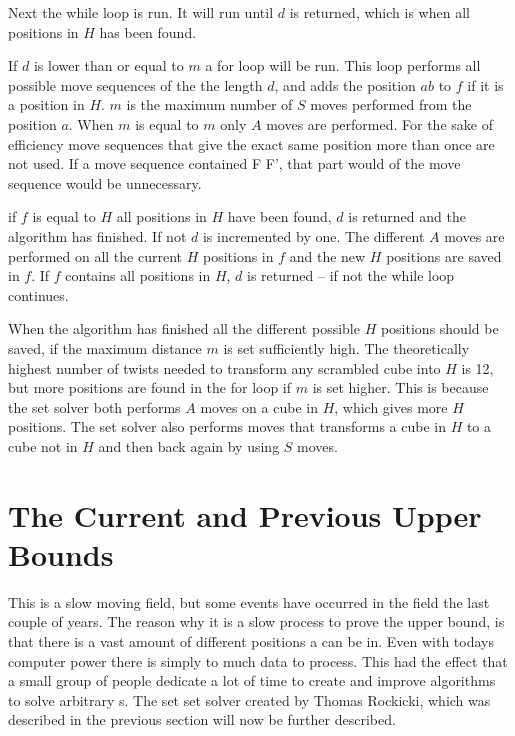 Next the while loop is run. It will run until $d$ is returned, which is when all positions in $H$ has been found.

If $d$ is lower than or equal to $m$ a for loop will be run. This loop performs all possible move sequences of the the length $d$, and adds the position $ab$ to $f$ if it is a position in $H$. $m$ is the maximum number of $S$ moves performed from the position $a$. When $m$ is equal to $m$ only $A$ moves are performed. %
For the sake of efficiency move sequences that give the exact same position more than once are not used. If a move sequence contained F F', that part would  of the move sequence would be unnecessary. 

if $f$ is equal to $H$ all positions in $H$ have been found, $d$ is returned and the algorithm has finished. 
If not $d$ is incremented by one. 
The different $A$ moves are performed on all the current $H$ positions in $f$ and the new $H$ positions are saved in $f$.
If $f$ contains all positions in $H$, $d$ is returned -- if not the while loop continues.


When the algorithm has finished all the different possible $H$ positions should be saved, if the maximum distance $m$ is set sufficiently high. The theoretically highest number of twists needed to transform any scrambled cube into $H$ is 12, but more positions are found in the for loop if $m$ is set higher. This is because the set solver both performs $A$ moves on a cube in $H$, which gives more $H$ positions. The set solver also performs moves that transforms a cube in $H$ to a cube not in $H$ and then back again by using $S$ moves.



\section{The Current and Previous Upper Bounds}
This is a slow moving field, but some events have occurred in the field the last couple of years.%
The reason why it is a slow process to prove the upper bound, is that there is a vast amount of different positions a \rubik{} can be in. Even with todays computer power there is simply to much data to process. This had the effect that a small group of people dedicate a lot of time to create and improve algorithms to solve arbitrary \rubik{}s. The set set solver created by Thomas Rockicki, which was described in the previous section will now be further described.

